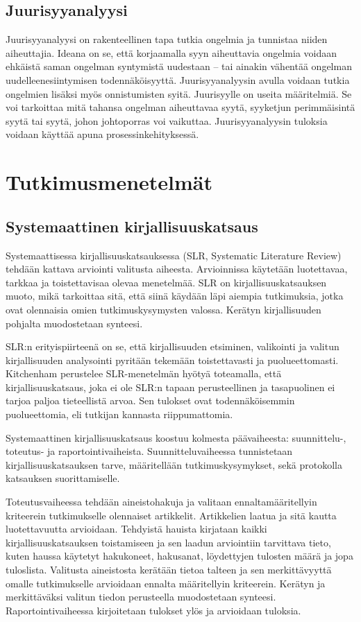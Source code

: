 \subsection{Juurisyyanalyysi}
Juurisyyanalyysi on rakenteellinen tapa tutkia ongelmia ja tunnistaa niiden aiheuttajia. Ideana on se, että korjaamalla syyn aiheuttavia ongelmia voidaan ehkäistä saman ongelman syntymistä uudestaan -- tai ainakin vähentää ongelman uudelleenesiintymisen todennäköisyyttä. \citep{Lehtinen2011} Juurisyyanalyysin avulla voidaan tutkia ongelmien lisäksi myös onnistumisten syitä. \citep{Bjornson2009} Juurisyylle on useita määritelmiä. Se voi tarkoittaa mitä tahansa ongelman aiheuttavaa syytä, syyketjun perimmäisintä syytä tai syytä, johon johtoporras voi vaikuttaa. Juurisyyanalyysin tuloksia voidaan käyttää apuna prosessinkehityksessä. \citep{Lehtinen2011}

\section{Tutkimusmenetelmät}
\subsection{Systemaattinen kirjallisuuskatsaus}
Systemaattisessa kirjallisuuskatsauksessa (SLR, Systematic Literature Review) tehdään kattava arviointi valitusta aiheesta. Arvioinnissa käytetään luotettavaa, tarkkaa ja toistettavisaa olevaa menetelmää. SLR on kirjallisuuskatsauksen muoto, mikä tarkoittaa sitä, että siinä käydään läpi aiempia tutkimuksia, jotka ovat olennaisia omien tutkimuskysymysten valossa. Kerätyn kirjallisuuden pohjalta muodostetaan synteesi.\citep{Kitchenham2007}

SLR:n erityispiirteenä on se, että kirjallisuuden etsiminen, valikointi ja valitun kirjallisuuden analysointi pyritään tekemään toistettavasti ja puolueettomasti. Kitchenham perustelee SLR-menetelmän hyötyä toteamalla, että kirjallisuuskatsaus, joka ei ole SLR:n tapaan perusteellinen ja tasapuolinen ei tarjoa paljoa tieteellistä arvoa. Sen tulokset ovat todennäköisemmin puolueettomia, eli tutkijan kannasta riippumattomia. \citep{Kitchenham2007}

Systemaattinen kirjallisuuskatsaus koostuu kolmesta päävaiheesta: suunnittelu-, toteutus- ja raportointivaiheista. Suunnitteluvaiheessa tunnistetaan kirjallisuuskatsauksen tarve, määritellään tutkimuskysymykset, sekä protokolla katsauksen suorittamiselle. \citep{Kitchenham2007}

Toteutusvaiheessa tehdään aineistohakuja ja valitaan ennaltamääritellyin kriteerein tutkimukselle olennaiset artikkelit. Artikkelien laatua ja sitä kautta luotettavuutta arvioidaan. Tehdyistä hauista kirjataan kaikki kirjallisuuskatsauksen toistamiseen ja sen laadun arviointiin tarvittava tieto, kuten haussa käytetyt hakukoneet, hakusanat, löydettyjen tulosten määrä ja jopa tuloslista. Valitusta aineistosta kerätään tietoa talteen ja sen merkittävyyttä omalle tutkimukselle arvioidaan ennalta määritellyin kriteerein. Kerätyn ja merkittäväksi valitun tiedon perusteella muodostetaan synteesi. Raportointivaiheessa kirjoitetaan tulokset ylös ja arvioidaan tuloksia. \citep{Kitchenham2007}

